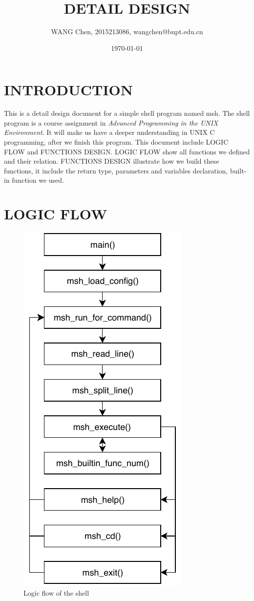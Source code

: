 \documentclass{article}
\title{DETAIL DESIGN}
\author{WANG Chen, 2015213086, wangchen@bupt.edu.cn}
\date{\today}
\begin{document}
\maketitle

\tableofcontents

\newpage
\section{INTRODUCTION}

This is a detail design document for a simple shell program named msh.
The shell program is a course assignment in \emph{Advanced Programming in the UNIX Environment}.
It will make us have a deeper understanding in UNIX C programming, after we finish this program.
This document include LOGIC FLOW and FUNCTIONS DESIGN.
LOGIC FLOW show all functions we defined and their relation.
FUNCTIONS DESIGN illustrate how we build these functions, it include the return type, parameters and variables declaration, built-in function we used.

\newpage
\section{LOGIC FLOW}

\begin{figure}[h]
\centering
\includegraphics[scale=0.85]{fig/ShellLogicFlow.pdf}
\caption{Logic flow of the shell}
\label{logicFlow}
\end{figure}
\end{document}
